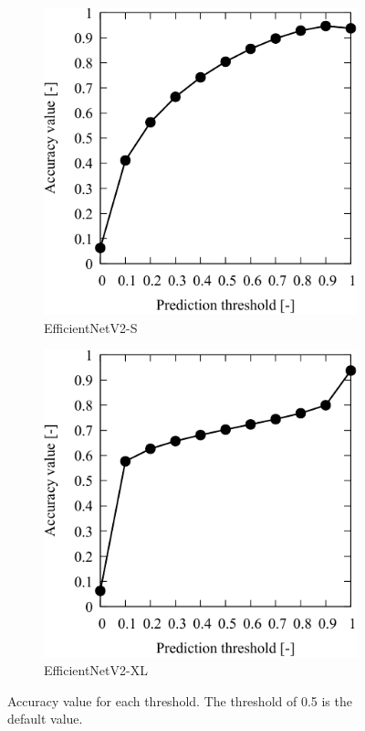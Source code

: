 \begin{figure}[H]
    \centering
    \begin{subfigure}[t]{0.45\linewidth}
        \includegraphics[width=\linewidth]{./Figure/4_Results/training/sresult/acc.pdf}
        \caption{EfficientNetV2-S}
        \label{fig:accuracyResult:s}
    \end{subfigure}
    \hfill
    \begin{subfigure}[t]{0.45\linewidth}
        \includegraphics[width=\linewidth]{./Figure/4_Results/training/xlresult/acc.pdf}
        \caption{EfficientNetV2-XL}
        \label{fig:accuracyResult:xl}
    \end{subfigure}

    \caption{Accuracy value for each threshold. The threshold of \num{0.5} is the default value.} 
    \label{fig:accuracyResult}
\end{figure}

